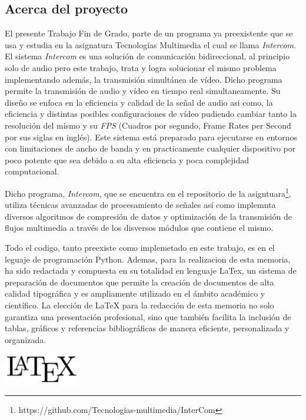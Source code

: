 \label{sec:justificacion_y_objetivos}

\subsection{Acerca del proyecto}

El presente Trabajo Fin de Grado, parte de un programa ya preexistente que se usa y estudia en la asignatura Tecnologías Multimedia el cual se llama \textit{Intercom}. El sistema \textit{Intercom} es una solución de comunicación bidireccional, al principio solo de audio pero este trabajo, trata y logra solucionar el mismo problema implementando además, la transmisión simultánea de vídeo. Dicho programa permite la transmisión de audio y vídeo en tiempo real simultaneamente. Su diseño se enfoca en la eficiencia y calidad de la señal de audio asi como, la eficiencia y distintas posibles configuraciones de vídeo pudiendo cambiar tanto la resolución del mismo y su \textit{FPS} (Cuadros por segundo, Frame Rates per Second por sus siglas en inglés). Este sistema está preparado para ejecutarse en entornos con limitaciones de ancho de banda y en practicamente cualquier dispositivo por poco potente que sea debido a su alta eficiencia y poca complejidad computacional.
\vspace{\baselineskip}

Dicho programa, \textit{Intercom}, que se encuentra en el repositorio de la asigntuara\footnote{https://github.com/Tecnologias-multimedia/InterCom}, utiliza técnicas avanzadas de procesamiento de señales así como implemnta diversos algoritmos de compresión de datos y optimización de la transmisión de flujos multimedia a través de los disversos módulos que contiene el mismo. 

\vspace{\baselineskip}
Todo el codigo, tanto preexiste como implemetado en este trabajo, es en el leguaje de programación Python. Ademas, para la realizacion de esta memoria, ha sido redactada y compuesta en su totalidad en lenguaje LaTex, un sistema de preparación de documentos que permite la creación de documentos de alta calidad tipográfica y es ampliamente utilizado en el ámbito académico y científico. La elección de LaTeX para la redacción de esta memoria no solo garantiza una presentación profesional, sino que también facilita la inclusión de tablas, gráficos y referencias bibliográficas de manera eficiente, personalizada y organizada.

\vspace{\baselineskip}
\begin{center}
	\includegraphics[width = 0.25\textwidth]{images/LaTeX_logo.png}
	\label{fig:latex}
\end{center}
\vspace{\baselineskip}

